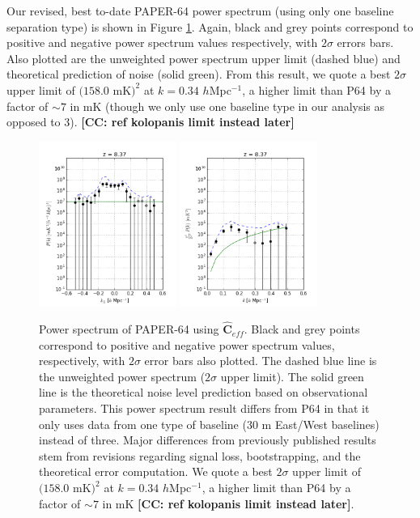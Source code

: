\documentclass[preprint2,numberedappendix,tighten]{aastex6}  %
\newcommand{\cc}[1]{{\color{purple} \textbf{[CC: #1]}}}
\begin{document}
Our revised, best to-date PAPER-64 power spectrum (using only one baseline separation type) is shown in Figure \ref{fig:ps1_data}. Again, black and grey points correspond to positive and negative power spectrum values respectively, with $2\sigma$ errors bars. Also plotted are the unweighted power spectrum upper limit (dashed blue) and theoretical prediction of noise (solid green). From this result, we quote a best $2\sigma$ upper limit of $(158.0$ mK$)^{2}$ at $k=0.34$ $h$Mpc$^{-1}$, a higher limit than P64 by a factor of $\sim7$ in mK (though we only use one baseline type in our analysis as opposed to $3$). \cc{ref kolopanis limit instead later}

\begin{figure}
	\centering
	\includegraphics[width=0.4\textwidth]{plots/ps1_data_reg.png}
	\includegraphics[width=0.4\textwidth]{plots/ps2_data_reg.png}
	\caption{Power spectrum of PAPER-64 using $\hat{\textbf{C}}_{eff}$. Black and grey points correspond to positive and negative power spectrum values, respectively, with $2\sigma$ error bars also plotted. The dashed blue line is the unweighted power spectrum ($2\sigma$ upper limit). The solid green line is the theoretical noise level prediction based on observational parameters. This power spectrum result differs from P64 in that it only uses data from one type of baseline ($30$ m East/West baselines) instead of three. Major differences from previously published results stem from revisions regarding signal loss, bootstrapping, and the theoretical error computation. We quote a best $2\sigma$ upper limit of $(158.0$ mK$)^{2}$ at $k=0.34$ $h$Mpc$^{-1}$, a higher limit than P64 by a factor of $\sim7$ in mK \cc{ref kolopanis limit instead later}.}
	\label{fig:ps1_data}
\end{figure}
\end{document}
